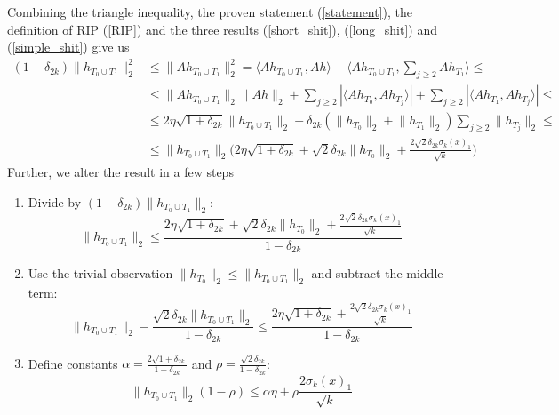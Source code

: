 \documentclass[11pt,oneside,czech,american]{book} %
\theoremstyle{plain}
\theoremstyle{definition}
\begin{document}
Combining the triangle inequality, the proven statement (\ref{statement}), the definition of RIP (\ref{RIP}) and the three results (\ref{short_shit}), (\ref{long_shit}) and (\ref{simple_shit}) give us
\begin{equation}
	\begin{aligned}
	(1-\delta_{2k}) \lVert h_{T_0 \cup T_1} \rVert^2_2 &\stackrel{ }{\leq} \lVert A h_{T_0 \cup T_1} \rVert^2_2 = \langle A h_{T_0 \cup T_1}, Ah\rangle - \langle A h_{T_0 \cup T_1}, \sum_{j\geq 2}Ah_{T_1}\rangle \stackrel{ }{\leq} \\
	&\stackrel{ }{\leq} \lVert A h_{T_0 \cup T_1} \rVert_2 \lVert A h \rVert_2 + \sum_{j\geq 2} |\langle A h_{T_0}, A h_{T_j} \rangle | + \sum_{j\geq 2} |\langle A h_{T_1}, A h_{T_j} \rangle | \stackrel{ }{\leq} \\
	&\stackrel{ }{\leq} 2 \eta \sqrt{1+\delta_{2k}} \lVert h_{T_0 \cup T_1} \rVert_2 + \delta_{2k}(\lVert h_{T_0} \rVert_2 + \lVert h_{T_1} \rVert_2) \sum_{j\geq 2} \lVert h_{T_j} \rVert_2 \leq \\
	&\leq \lVert h_{T_0 \cup T_1} \rVert_2 \Big( 2 \eta \sqrt{1+\delta_{2k}} + \sqrt{2} \delta_{2k} \lVert h_{T_0} \rVert_2 + \frac{2 \sqrt{2} \delta_{2k}\sigma_k(x)_1}{\sqrt{k}} \Big) 
	\end{aligned}
\end{equation}
Further, we alter the result in a few steps
\begin{enumerate}
	\item Divide by $(1 - \delta_{2k}) \lVert h_{T_0 \cup T_1} \rVert_2$:
\begin{equation}
	\lVert h_{T_0 \cup T_1} \rVert_2 \leq \frac{2 \eta \sqrt{1+\delta_{2k}} + \sqrt{2} \delta_{2k} \lVert h_{T_0} \rVert_2 + \frac{2 \sqrt{2} \delta_{2k}\sigma_k(x)_1}{\sqrt{k}}}{1 - \delta_{2k}}
\end{equation}
	\item Use the trivial observation $\lVert h_{T_0} \rVert_2 \leq \lVert h_{T_0 \cup T_1} \rVert_2$ and subtract the middle term:
	\begin{equation}
		\lVert h_{T_0 \cup T_1} \rVert_2 - \frac{\sqrt{2} \delta_{2k} \lVert h_{T_0 \cup T_1} \rVert_2}{1-\delta_{2k}}  \leq \frac{2 \eta \sqrt{1+\delta_{2k}} + \frac{2 \sqrt{2} \delta_{2k}\sigma_k(x)_1}{\sqrt{k}}}{1 - \delta_{2k}}
	\end{equation}
	\item Define constants $\alpha = \frac{2\sqrt{1+\delta_{2k}}}{1-\delta_{2k}}$ and $\rho = \frac{\sqrt{2}\delta_{2k}}{1-\delta_{2k}}$:
	\begin{equation}
		\lVert h_{T_0 \cup T_1} \rVert_2 (1-\rho)\leq \alpha\eta + \rho \frac{2 \sigma_k(x)_1}{\sqrt{k}}
		\label{constanted}
	\end{equation}
\end{enumerate}
\end{document}
